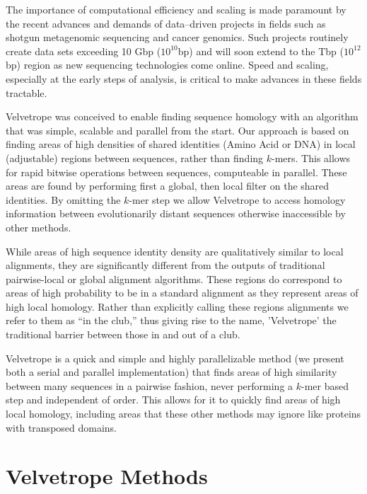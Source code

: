 \documentclass[phd,tocprelim]{cornell}
\begin{document}
The importance of computational efficiency and scaling is made paramount by the recent advances
and demands of data--driven projects in fields such as
shotgun metagenomic sequencing and cancer genomics. Such projects
routinely create data sets exceeding 10 Gbp ($10^{10}$bp) and will soon extend
to the Tbp ($10^{12}$bp) region as new sequencing technologies come online. Speed
and scaling, especially at the early steps of analysis, is critical to make advances in these fields tractable.

Velvetrope was conceived to enable finding sequence homology with an algorithm that
was simple, scalable and parallel from the start. Our approach is based on finding areas of high densities of shared identities (Amino Acid or DNA) in local
(adjustable) regions between sequences, rather than finding $k$-mers. This allows for rapid bitwise operations between sequences, computeable in parallel. These areas are found by performing first a global, then local filter on the shared identities. By omitting the $k$-mer step we allow Velvetrope to access homology information between evolutionarily distant sequences otherwise inaccessible by other methods.

While areas of high sequence identity density are qualitatively similar to local alignments, they are significantly different from the outputs of traditional pairwise-local or global alignment algorithms. These regions do correspond to areas of high probability to be in a standard alignment as they represent areas of high local homology. Rather than explicitly calling these regions alignments we refer to them as ``in the club,'' thus giving rise to the name, 'Velvetrope' the traditional barrier between those in and out of a club.

Velvetrope is a quick and simple and highly parallelizable method (we present both a serial and parallel implementation)
that finds areas of high similarity between many
sequences in a pairwise fashion, never performing a $k$-mer based step and independent of order. This allows for it
to quickly find areas of high local homology, including areas that these other
methods may ignore like proteins with transposed domains.


\chapter{Velvetrope Methods} %
\label{cha:Velvetrope Methods}
\end{document}
